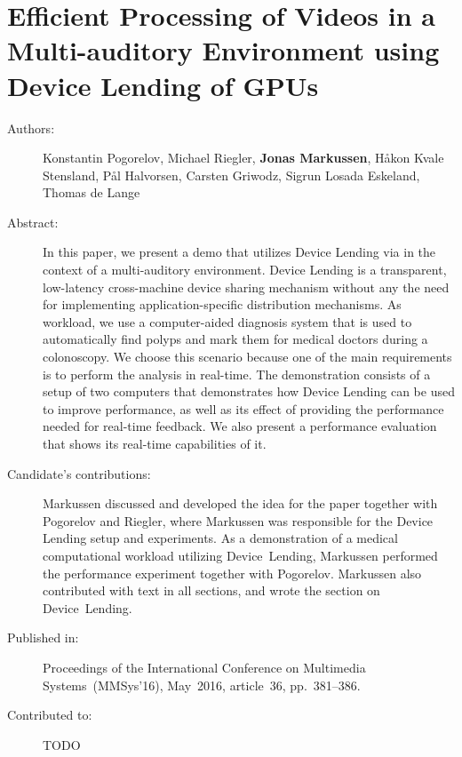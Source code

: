 \chapter{Efficient Processing of Videos in a Multi-auditory Environment using Device Lending of GPUs}
\label{paper:MMSys}
\paperthumb

\begin{description}
	\item[Authors:]
	Konstantin Pogorelov, Michael Riegler, \textbf{Jonas Markussen}, H{\aa}kon Kvale Stensland,
	P{\aa}l Halvorsen, Carsten Griwodz, Sigrun Losada Eskeland, Thomas de Lange


	\item[Abstract:]
		In this paper, we present a demo that utilizes Device Lending 
		via  in the context of a multi-auditory
		environment. Device Lending is a transparent, low-latency
		cross-machine  device sharing mechanism without any
		the need for implementing application-specific distribution
		mechanisms. As workload, we use a computer-aided diagnosis 
		system that is used to automatically find polyps and
		mark them for medical doctors during a colonoscopy. We
		choose this scenario because one of the main requirements
		is to perform the analysis in real-time. The demonstration
		consists of a setup of two computers that demonstrates how
		Device Lending can be used to improve performance, as well
		as its effect of providing the performance needed for 
		real-time feedback. We also present a performance evaluation
		that shows its real-time capabilities of it.


	\item[Candidate's contributions:]
		Markussen discussed and developed the idea for the paper together with Pogorelov and Riegler, where Markussen was responsible for the Device Lending setup and experiments.
		As a demonstration of a medical computational workload utilizing Device~Lending,
		Markussen performed the performance experiment together with Pogorelov.
		Markussen also contributed with text in all sections, and wrote the section on Device~Lending.

	\item[Published in:]
	Proceedings of the International Conference on Multimedia Systems~(MMSys'16),
	May~2016, article~36, pp.~381--386.

	\item[Contributed to:]
		TODO

\end{description}
